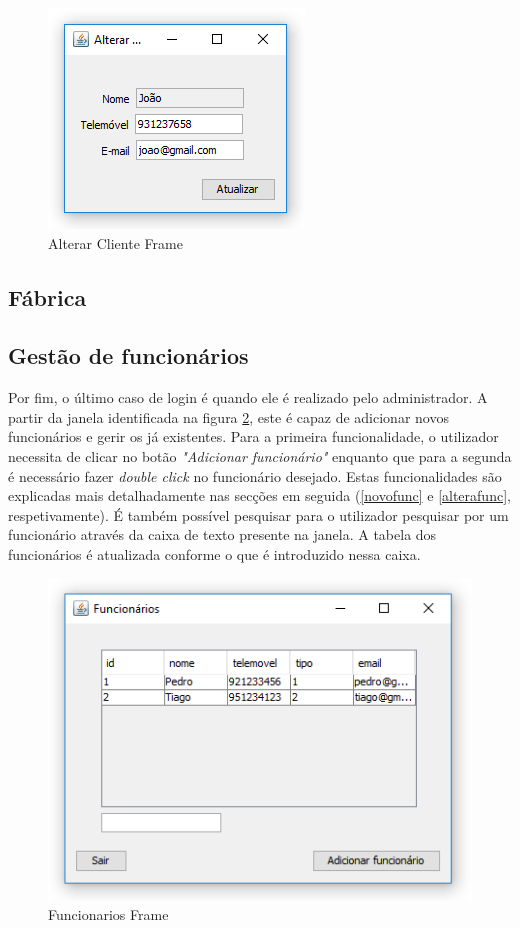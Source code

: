\documentclass[11pt]{article} %
\begin{document}
\begin{figure}[H]
	\centering
	\includegraphics[]{alterarclienteframe.png}
	\caption{Alterar Cliente Frame}
	\label{alterarclienteframe}
\end{figure}


\subsection{Fábrica}
\label{fabricasec}



\subsection{Gestão de funcionários}
\label{adminsec}

Por fim, o último caso de login é quando ele é realizado pelo administrador. A partir da janela identificada na figura \ref{funcionariosframe}, este é capaz de adicionar novos funcionários e gerir os já existentes. Para a primeira funcionalidade, o utilizador necessita de clicar no botão \textit{"Adicionar funcionário"} enquanto que para a segunda é necessário fazer \textit{double click} no funcionário desejado. Estas funcionalidades são explicadas mais detalhadamente nas secções em seguida (\ref{novofunc} e \ref{alterafunc}, respetivamente). É também possível pesquisar para o utilizador pesquisar por um funcionário através da caixa de texto presente na janela. A tabela dos funcionários é atualizada conforme o que é introduzido nessa caixa.


\begin{figure}[H]
	\centering
	\includegraphics[]{funcionariosframe.png}
	\caption{Funcionarios Frame}
	\label{funcionariosframe}
\end{figure}
\end{document}
